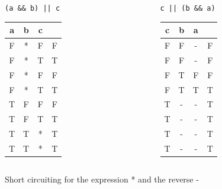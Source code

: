\documentclass[xcolor = {dvipsnames, table}, aspectratio=169]{beamer}
\begin{document}
\begin{frame}
    \centering
    \begin{columns}
        \begin{column}{0.3\textwidth}
            \centering
            \lstinline{(a && b) || c}
            \begin{tabular}{c c c | c}
                a & b & c & \\
                \hline
                F & * & F & F \\
                F & * & T & T \\
                F & * & F & F \\
                F & * & T & T \\

                T & F & F & F \\
                T & F & T & T \\
                T & T & * & T \\
                T & T & * & T \\
            \end{tabular}
        \end{column}

        \begin{column}{0.3\textwidth}
            \centering
            \lstinline{c || (b && a)}
            \begin{tabular}{c c c | c}
                c & b & a & \\
                \hline
                F & F & - & F \\
                F & F & - & F \\
                F & T & F & F \\
                F & T & T & T \\

                T & - & - & T \\
                T & - & - & T \\
                T & - & - & T \\
                T & - & - & T \\
            \end{tabular}
        \end{column}
    \end{columns}

    \begin{block}{}
        Short circuiting for the expression * and the reverse -
    \end{block}
\end{frame}
\end{document}
